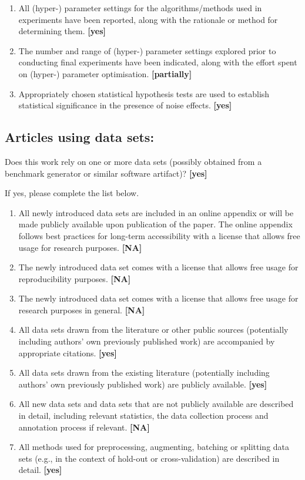 \begin{enumerate}
    Analysis of results goes beyond single-dimensional summaries of performance
    (e.g., average, median) to include measures of variation, confidence, or
    other distributional information. \textbf{[yes]}
    \item
    All (hyper-) parameter settings for
    the algorithms/methods used in experiments have been reported, along with
    the rationale or method for determining them. \textbf{[yes]}
    \item
    The number and range of (hyper-) parameter settings explored prior to
    conducting final experiments have been indicated, along with the effort
    spent on (hyper-) parameter optimisation. \textbf{[partially]}
    \item
    Appropriately chosen statistical hypothesis tests are used to establish
    statistical significance in the presence of noise effects.
    \textbf{[yes]}
\end{enumerate}


\subsection*{Articles using data sets:}
Does this work rely on one or more data sets (possibly obtained from a
benchmark generator or similar software artifact)? \textbf{[yes]}

If yes, please complete the list below.
\begin{enumerate}
    \item
    All newly introduced data sets
    are included in an online appendix
    or will be made publicly available upon publication of the paper.
    The online appendix follows best practices for long-term accessibility with
    a license that allows free usage for research purposes. \textbf{[NA]}
    \item The newly introduced data set comes with a license that
    allows free usage for reproducibility purposes. \textbf{[NA]}
    \item The newly introduced data set comes with a license that
    allows free usage for research purposes in general. \textbf{[NA]}
    \item All data sets drawn from the literature or other public sources
    (potentially including authors' own previously published work) are
    accompanied by appropriate citations. \textbf{[yes]}
    \item All data sets drawn from the existing literature (potentially
    including authors' own previously published work) are publicly available.
    \textbf{[yes]}
    \item All new data sets and data sets that are not publicly available are
    described in detail, including relevant statistics, the data collection
    process and annotation process if relevant. \textbf{[NA]}
    \item
    All methods used for preprocessing, augmenting, batching or splitting data
    sets (e.g., in the context of hold-out or cross-validation)
    are described in detail. \textbf{[yes]}
\end{enumerate}

